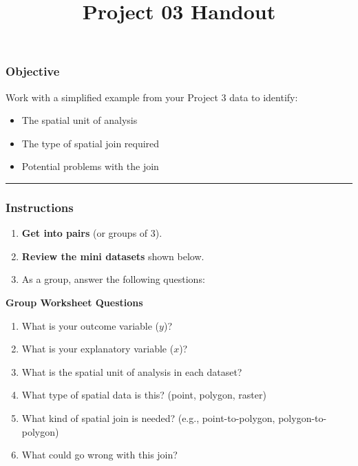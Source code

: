 \documentclass[
  11pt,
]{article}
\title{Project 03 Handout}
\author{}
\date{\vspace{-2.5em}}
\providecommand{\tightlist}{%
  \setlength{\itemsep}{0pt}\setlength{\parskip}{0pt}}
\begin{document}
\maketitle

\subsubsection{Objective}\label{objective}

Work with a simplified example from your Project 3 data to identify:

\begin{itemize}
\tightlist
\item
  The spatial unit of analysis\\
\item
  The type of spatial join required\\
\item
  Potential problems with the join
\end{itemize}

\begin{center}\rule{0.5\linewidth}{0.5pt}\end{center}

\subsubsection{Instructions}\label{instructions}

\begin{enumerate}
\def\labelenumi{\arabic{enumi}.}
\tightlist
\item
  \textbf{Get into pairs} (or groups of 3).
\item
  \textbf{Review the mini datasets} shown below.
\item
  As a group, answer the following questions:
\end{enumerate}

\textbf{Group Worksheet Questions}

\begin{enumerate}
\def\labelenumi{\arabic{enumi}.}
\tightlist
\item
  What is your outcome variable (\(y\))?
\item
  What is your explanatory variable (\(x\))?
\item
  What is the spatial unit of analysis in each dataset?
\item
  What type of spatial data is this? (point, polygon, raster)
\item
  What kind of spatial join is needed? (e.g., point-to-polygon,
  polygon-to-polygon)
\item
  What could go wrong with this join?
\end{enumerate}
\end{document}
